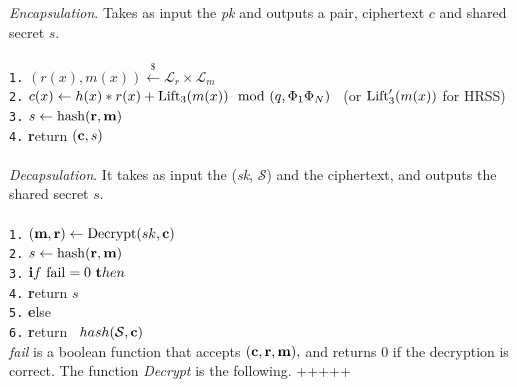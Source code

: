 \documentclass{amsart}
\numberwithin{equation}{section}
\begin{document}
 {\it Encapsulation}. Takes as input the {\it{pk}} and outputs a pair, ciphertext $c$ and shared secret $s.$\\\\
\texttt{1.} $(r(x),m(x)) \xleftarrow{\$} {\mathcal{L}}_r\times {\mathcal{L}}_m$ \\
\texttt{2.} $ c(x) \leftarrow h(x)*r(x) + {\rm{Lift}_3}(m(x)) \mod{(q,\Phi_1\Phi_N)}$ \ (or ${\rm{Lift}'_3}(m(x))$ for HRSS)\\
\texttt{3.}  $s \leftarrow {\rm{hash}}({\textbf r},{\textbf m})$\\
\texttt{4.} {\textbf return} $({\textbf c},s)$\\\\
 {\it Decapsulation}. It takes as input the ({\it{sk}}, ${\mathcal{S}}$) and the ciphertext, and outputs the shared secret $s.$\\\\
 \texttt{1.}  $({\textbf m},{\textbf r}) \leftarrow {\rm{Decrypt}}(sk,{\textbf c})$\\
 \texttt{2.}  $ s \leftarrow {\rm hash}({\textbf r},{\textbf m})$\\
\texttt{3.} ${\textbf if} {\ \rm fail}=0\ {\textbf then}$ \\
\texttt{4.} \hspace{10pt} {\textbf return}  $s$ \\
\texttt{5.}  {\textbf else}\ \\
\texttt{6.}  \hspace{10pt} {\textbf return}  \ $hash({\mathcal{S}},{\textbf c})$ \\
  
 {\it{fail}} is a boolean function that accepts $({\textbf c},{\textbf r},{\textbf m}),$ and returns $0$ if the decryption is correct.
 The function {\it{Decrypt}} is the following.
 +++++
\end{document}
